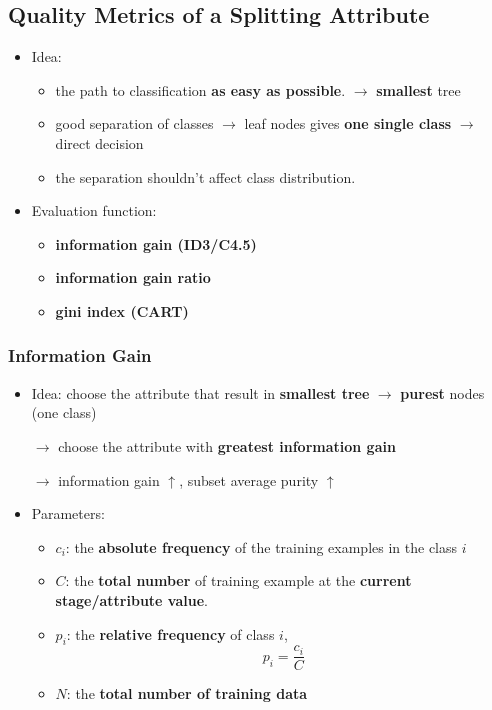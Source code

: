 \subsection{Quality Metrics of a Splitting Attribute}
\begin{itemize}
	\item Idea: 
	\begin{itemize}
		\item the path to classification \textbf{as easy as possible}. $\rightarrow$ \textbf{smallest} tree
		\item good separation of classes $\rightarrow$ leaf nodes gives \textbf{one single class} $\rightarrow$ direct decision
		\item the separation shouldn't affect class distribution.
	\end{itemize}
	\item Evaluation function:
	\begin{itemize}
		\item \textbf{information gain (ID3/C4.5)}
		\item \textbf{information gain ratio}
		\item \textbf{gini index (CART)}
	\end{itemize}
\end{itemize}

\subsubsection{Information Gain}
\begin{itemize}
	\item Idea: choose the attribute that result in \textbf{smallest tree} $\rightarrow$ \textbf{purest} nodes (one class)
	
	$\rightarrow$ choose the attribute with \textbf{greatest information gain}
	
	$\rightarrow$ information gain $\uparrow$, subset average purity $\uparrow$
	
	
	\item Parameters:
	\begin{itemize}
		\item $c_i$: the \textbf{absolute frequency} of the training examples in the class $i$
		\item $C$: the \textbf{total number} of training example at the \textbf{current stage/attribute value}.
		\item $p_i$: the \textbf{relative frequency} of class $i$, $$p_i = \frac{c_i}{C}$$
		\item $N$: the \textbf{total number of training data}
	\end{itemize}
\end{itemize}


